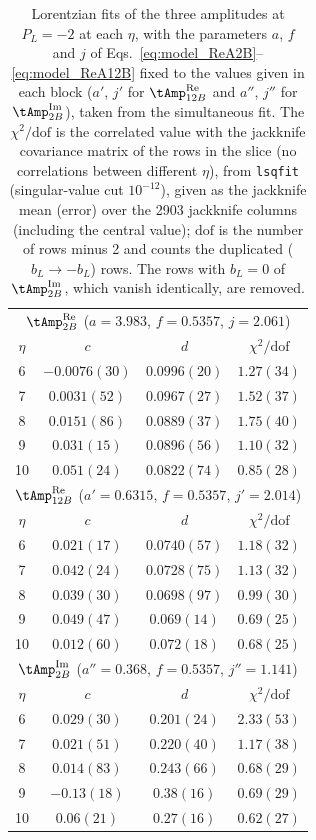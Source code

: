 \begin{table}
\caption{Lorentzian fits of the three amplitudes at $P_L=-2$ at each $\eta$, with the parameters $a$, $f$ and $j$ of Eqs.~\eqref{eq:model_ReA2B}--\eqref{eq:model_ReA12B} fixed to the values given in each block ($a'$, $j'$ for $\tAmp_{12B}^{\text{Re}}$ and $a''$, $j''$ for $\tAmp_{2B}^{\text{Im}}$), taken from the simultaneous fit. The $\chi^2/\mathrm{dof}$ is the correlated value with the jackknife covariance matrix of the rows in the slice (no correlations between different $\eta$), from \texttt{lsqfit} (singular-value cut $10^{-12}$), given as the jackknife mean (error) over the 2903 jackknife columns (including the central value); $\mathrm{dof}$ is the number of rows minus 2 and counts the duplicated ($b_L\to-b_L$) rows. The rows with $b_L=0$ of $\tAmp_{2B}^{\text{Im}}$, which vanish identically, are removed.}
\label{tab:eta_slices_PL2}
\small
\begin{ruledtabular}
\begin{tabular}{cccc}
\multicolumn{4}{c}{$\tAmp_{2B}^{\text{Re}}$ ($a=3.983$, $f=0.5357$, $j=2.061$)} \\
$\eta$ & $c$ & $d$ & $\chi^2/\mathrm{dof}$ \\ \hline
6 & $-0.0076(30)$ & $0.0996(20)$ & $1.27(34)$ \\
7 & $0.0031(52)$ & $0.0967(27)$ & $1.52(37)$ \\
8 & $0.0151(86)$ & $0.0889(37)$ & $1.75(40)$ \\
9 & $0.031(15)$ & $0.0896(56)$ & $1.10(32)$ \\
10 & $0.051(24)$ & $0.0822(74)$ & $0.85(28)$ \\
\hline
\multicolumn{4}{c}{$\tAmp_{12B}^{\text{Re}}$ ($a'=0.6315$, $f=0.5357$, $j'=2.014$)} \\
$\eta$ & $c$ & $d$ & $\chi^2/\mathrm{dof}$ \\ \hline
6 & $0.021(17)$ & $0.0740(57)$ & $1.18(32)$ \\
7 & $0.042(24)$ & $0.0728(75)$ & $1.13(32)$ \\
8 & $0.039(30)$ & $0.0698(97)$ & $0.99(30)$ \\
9 & $0.049(47)$ & $0.069(14)$ & $0.69(25)$ \\
10 & $0.012(60)$ & $0.072(18)$ & $0.68(25)$ \\
\hline
\multicolumn{4}{c}{$\tAmp_{2B}^{\text{Im}}$ ($a''=0.368$, $f=0.5357$, $j''=1.141$)} \\
$\eta$ & $c$ & $d$ & $\chi^2/\mathrm{dof}$ \\ \hline
6 & $0.029(30)$ & $0.201(24)$ & $2.33(53)$ \\
7 & $0.021(51)$ & $0.220(40)$ & $1.17(38)$ \\
8 & $0.014(83)$ & $0.243(66)$ & $0.68(29)$ \\
9 & $-0.13(18)$ & $0.38(16)$ & $0.69(29)$ \\
10 & $0.06(21)$ & $0.27(16)$ & $0.62(27)$ \\
\end{tabular}
\end{ruledtabular}
\end{table}

